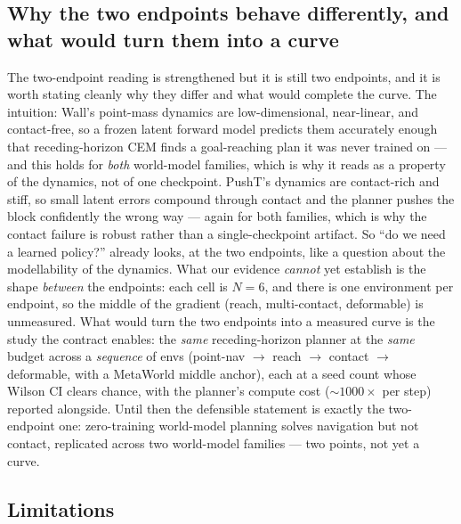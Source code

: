 \documentclass[10pt]{article}
\begin{document}
\subsection{Why the two endpoints behave differently, and what would
turn them into a curve}
The two-endpoint reading is strengthened but it is still two endpoints, and
it is worth stating cleanly why they differ and what would complete the
curve. The intuition: Wall's point-mass dynamics are low-dimensional,
near-linear, and contact-free, so a frozen latent forward model predicts
them accurately enough that receding-horizon CEM finds a goal-reaching plan
it was never trained on --- and this holds for \emph{both} world-model
families, which is why it reads as a property of the dynamics, not of one
checkpoint. PushT's dynamics are contact-rich and stiff, so small latent
errors compound through contact and the planner pushes the block
confidently the wrong way --- again for both families, which is why the
contact failure is robust rather than a single-checkpoint artifact. So
``do we need a learned policy?'' already looks, at the two endpoints, like a
question about the modellability of the dynamics. What our evidence
\emph{cannot} yet establish is the shape \emph{between} the endpoints: each
cell is $N{=}6$, and there is one environment per endpoint, so the middle of
the gradient (reach, multi-contact, deformable) is unmeasured. What would
turn the two endpoints into a measured curve is the study the contract
enables: the \emph{same} receding-horizon planner at the \emph{same} budget
across a \emph{sequence} of envs (point-nav $\to$ reach $\to$ contact $\to$
deformable, with a MetaWorld middle anchor), each at a seed count whose
Wilson CI clears chance, with the planner's compute cost
(${\sim}1000\times$ per step) reported alongside. Until then the defensible
statement is exactly the two-endpoint one: zero-training world-model
planning solves navigation but not contact, replicated across two
world-model families --- two points, not yet a curve.

\subsection{Limitations}
\end{document}

